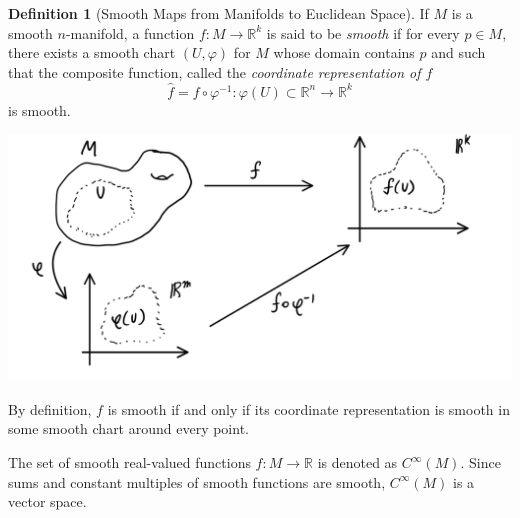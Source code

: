 \documentclass{article}
\theoremstyle{remark}
\theoremstyle{definition}
\newtheorem{definition}{Definition}[section]
\begin{document}
  \begin{definition}[Smooth Maps from Manifolds to Euclidean Space]
    If $M$ is a smooth $n$-manifold, a function $f: M \longrightarrow \mathbb{R}^k$ is said to be \textit{smooth} if for every $p \in M$, there exists a smooth chart $(U, \varphi)$ for $M$ whose domain contains $p$ and such that the composite function, called the \textit{coordinate representation of $f$}
    \[\hat{f} = f \circ \varphi^{-1}: \varphi(U) \subset \mathbb{R}^n \longrightarrow \mathbb{R}^k\]
    is smooth. 
    \begin{center}
      \includegraphics[scale=0.24]{img/Function_Manifold_to_Euclidean_Space.PNG}
    \end{center}
    By definition, $f$ is smooth if and only if its coordinate representation is smooth in some smooth chart around every point. 
  \end{definition}

  The set of smooth real-valued functions $f: M \longrightarrow \mathbb{R}$ is denoted as $C^\infty (M)$. Since sums and constant multiples of smooth functions are smooth, $C^\infty (M)$ is a vector space. 
\end{document}
